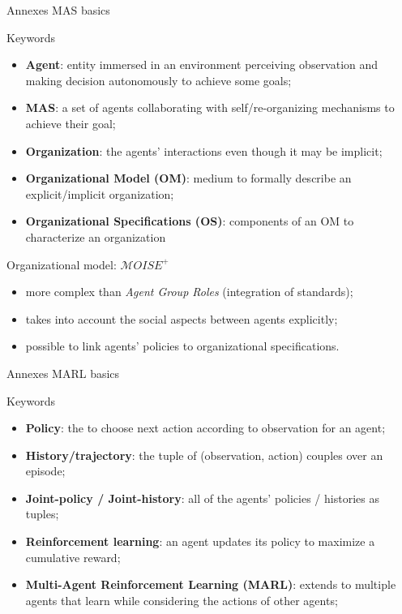 \begin{frame}{Annexes}
    {MAS basics}

    \begin{block}{Keywords}
        \begin{itemize}
            \item \textbf{Agent}: entity immersed in an environment perceiving observation and making decision autonomously to achieve some goals;
            \item \textbf{MAS}: a set of agents collaborating with self/re-organizing mechanisms to achieve their goal;
            \item \textbf{Organization}: the agents' interactions even though it may be implicit;
            \item \textbf{Organizational Model (OM)}: medium to formally describe an explicit/implicit organization;
            \item \textbf{Organizational Specifications (OS)}: components of an OM to characterize an organization
        \end{itemize}
    \end{block}

    \begin{block}{Organizational model: $\mathcal{M}OISE^+$}
        \begin{itemize}
            \item more complex than \emph{Agent Group Roles} (integration of standards);
            \item takes into account the social aspects between agents explicitly;
            \item possible to link agents' policies to organizational specifications.
        \end{itemize}
    \end{block}

\end{frame}

\begin{frame}{Annexes}
    {MARL basics}

    \begin{block}{Keywords}
        \begin{itemize}
            \item \textbf{Policy}: the  to choose next action according to observation for an agent;
            \item \textbf{History/trajectory}: the tuple of (observation, action) couples over an episode;
            \item \textbf{Joint-policy / Joint-history}: all of the agents' policies / histories as tuples;
            \item \textbf{Reinforcement learning}: an agent updates its policy to maximize a cumulative reward;
            \item \textbf{Multi-Agent Reinforcement Learning (MARL)}: extends to multiple agents that learn while considering the actions of other agents;
        \end{itemize}
    \end{block}

\end{frame}

